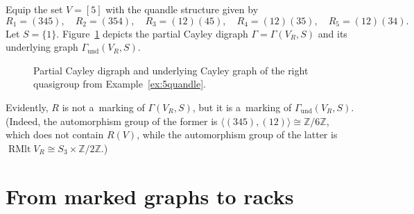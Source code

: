\documentclass{jonasart}
\DeclareMathOperator{\RMlt}{RMlt}
\newcommand{\und}{\mathrm{und}}
\newcommand{\Z}{\mathbb{Z}}
\begin{document}
	\begin{example}\label{ex:5quandle}
		Equip the set $V=[5]$ with the quandle structure given by
		\[
			R_1=(345),\quad R_2=(354),\quad R_3=(12)(45), \quad R_4=(12)(35), \quad R_5=(12)(34).
        \]
		Let $S=\{1\}$. Figure~\ref{fig:5quandle} depicts the partial Cayley digraph $\Gamma=\Gamma(V_R,S)$ and its underlying graph $\Gamma_{\und}(V_R,S)$.
		\begin{figure}[!ht]
			\centering
			\caption{Partial Cayley digraph and underlying Cayley graph of the right quasigroup from Example~\ref{ex:5quandle}.}
			\label{fig:5quandle}
		\end{figure}
		Evidently, $R$ is not a~marking of $\Gamma(V_R,S)$, but it is a~marking of $\Gamma_{\und}(V_R,S)$.
		(Indeed, the automorphism group of the former is $\langle (345),(12)\rangle\cong\Z/6\Z$, which does not contain $R(V)$, while the automorphism group of the latter is $\RMlt V_R \cong S_3\times\Z/2\Z$.)
	\end{example}

	\section{From marked graphs to racks}\label{sec:3}
    
\end{document}
